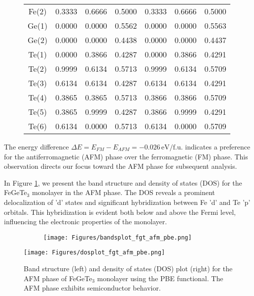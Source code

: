 \begin{figure}[H]
\begin{minipage}[b]{.55\linewidth}
{\begin{tabular}{ccccccc}
				Fe(2) & 0.3333 & 0.6666 & 0.5000  & 0.3333 &  0.6666 & 0.5000  \\
				Ge(1) & 0.0000 & 0.0000 & 0.5562  & 0.0000 &  0.0000 & 0.5563  \\ 
				Ge(2) & 0.0000 & 0.0000 & 0.4438  & 0.0000 &  0.0000 & 0.4437  \\
				Te(1) & 0.0000 & 0.3866 & 0.4287  & 0.0000 &  0.3866 & 0.4291  \\
				Te(2) & 0.9999 & 0.6134 & 0.5713  & 0.9999 &  0.6134 & 0.5709  \\
				Te(3) & 0.6134 & 0.6134 & 0.4287  & 0.6134 &  0.6134 & 0.4291  \\
				Te(4) & 0.3865 & 0.3865 & 0.5713  & 0.3866 &  0.3866 & 0.5709  \\
				Te(5) & 0.3865 & 0.9999 & 0.4287  & 0.3866 &  0.9999 & 0.4291  \\
				Te(6) & 0.6134 & 0.0000 & 0.5713  & 0.6134 &  0.0000 & 0.5709  \\
				\bottomrule
				\bottomrule
			\end{tabular}
		}
	\end{minipage}
\end{figure}

The energy difference $\Delta E = E_{FM} - E_{AFM} = -0.026 \, \text{eV/f.u.}$ indicates a preference for the antiferromagnetic (AFM) phase over the ferromagnetic (FM) phase. This observation directs our focus toward the AFM phase for subsequent analysis.

In Figure \ref{fig:4.16}, we present the band structure and density of states (DOS) for the FeGeTe\(_3\) monolayer in the AFM phase. The DOS reveals a prominent delocalization of 'd' states and significant hybridization between Fe 'd' and Te 'p' orbitals. This hybridization is evident both below and above the Fermi level, influencing the electronic properties of the monolayer.

\begin{figure}[H]
	\begin{subfigure}{.5\textwidth}
		\centering
		\texttt{[image: Figures/bandsplot\_fgt\_afm\_pbe.png]}
	\end{subfigure}%
	\begin{minipage}{.5\textwidth}
		\vspace{-12.9cm}
		\centering
		\texttt{[image: Figures/dosplot\_fgt\_afm\_pbe.png]}
		\captionsetup{justification=centering}
	\end{minipage}
	\caption{Band structure (left) and density of states (DOS) plot (right) for the AFM phase of FeGeTe$_3$ monolayer using the PBE functional. The AFM phase exhibits semiconductor behavior.}
	\label{fig:4.16}
\end{figure}


